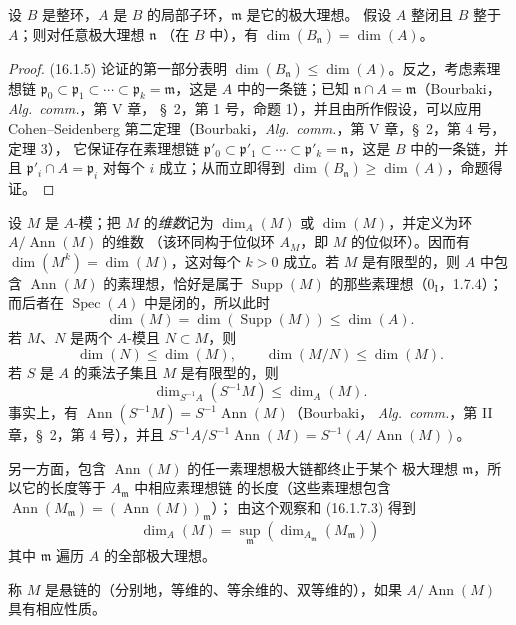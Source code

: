 \begin{proposition}[16.1.6]
\label{0.16.1.6-fr}
设 $B$ 是整环，$A$ 是 $B$ 的局部子环，$\mathfrak{m}$ 是它的极大理想。
假设 $A$ 整闭且 $B$ 整于 $A$；则对任意极大理想 $\mathfrak{n}$
（在 $B$ 中），有 $\dim(B_{\mathfrak{n}})=\dim(A)$。
\end{proposition}

\begin{proof}
(16.1.5) 论证的第一部分表明
$\dim(B_{\mathfrak{n}})\leq\dim(A)$。反之，考虑素理想链
$\mathfrak{p}_0\subset\mathfrak{p}_1\subset\cdots\subset
\mathfrak{p}_k=\mathfrak{m}$，这是 $A$ 中的一条链；已知
$\mathfrak{n}\cap A=\mathfrak{m}$（Bourbaki，\emph{Alg.~comm.}，第 V 章，
\S~2，第 1 号，命题 1），并且由所作假设，可以应用 Cohen--Seidenberg
第二定理（Bourbaki，\emph{Alg.~comm.}，第 V 章，\S~2，第 4 号，定理 3），
它保证存在素理想链
$\mathfrak{p}'_0\subset\mathfrak{p}'_1\subset\cdots\subset
\mathfrak{p}'_k=\mathfrak{n}$，这是 $B$ 中的一条链，并且
$\mathfrak{p}'_i\cap A=\mathfrak{p}_i$ 对每个 $i$ 成立；从而立即得到
$\dim(B_{\mathfrak{n}})\geq\dim(A)$，命题得证。
\end{proof}

\begin{env}[16.1.7]
\label{0.16.1.7-fr}
设 $M$ 是 $A$-模；把 $M$ 的\emph{维数}记为
$\dim_A(M)$ 或 $\dim(M)$，并定义为环 $A/\operatorname{Ann}(M)$ 的维数
（该环同构于位似环 $A_M$，即 $M$ 的位似环）。因而有
$\dim(M^k)=\dim(M)$，这对每个 $k>0$ 成立。若 $M$ 是有限型的，则 $A$ 中包含
$\operatorname{Ann}(M)$ 的素理想，恰好是属于 $\operatorname{Supp}(M)$
的那些素理想（$0_{\mathrm I}$，1.7.4）；而后者在
$\operatorname{Spec}(A)$ 中是闭的，所以此时
\[
\label{0.16.1.7.1-fr}
  \dim(M)=\dim(\operatorname{Supp}(M))\leq\dim(A).
\tag{16.1.7.1}
\]
若 $M$、$N$ 是两个 $A$-模且 $N\subset M$，则
\[
\label{0.16.1.7.2-fr}
  \dim(N)\leq\dim(M),\qquad \dim(M/N)\leq\dim(M).
\tag{16.1.7.2}
\]
若 $S$ 是 $A$ 的乘法子集且 $M$ 是有限型的，则
\[
\label{0.16.1.7.3-fr}
  \dim_{S^{-1}A}(S^{-1}M)\leq\dim_A(M).
\tag{16.1.7.3}
\]
事实上，有
$\operatorname{Ann}(S^{-1}M)=S^{-1}\operatorname{Ann}(M)$（Bourbaki，
\emph{Alg.~comm.}，第 II 章，\S~2，第 4 号），并且
$S^{-1}A/S^{-1}\operatorname{Ann}(M)=S^{-1}(A/\operatorname{Ann}(M))$。

另一方面，包含 $\operatorname{Ann}(M)$ 的任一素理想极大链都终止于某个
极大理想 $\mathfrak{m}$，所以它的长度等于 $A_{\mathfrak{m}}$ 中相应素理想链
的长度（这些素理想包含
$\operatorname{Ann}(M_{\mathfrak{m}})=(\operatorname{Ann}(M))_{\mathfrak{m}}$）；
由这个观察和 (16.1.7.3) 得到
\[
\label{0.16.1.7.4-fr}
  \dim_A(M)=\sup_{\mathfrak{m}}
  (\dim_{A_{\mathfrak{m}}}(M_{\mathfrak{m}}))
\tag{16.1.7.4}
\]
其中 $\mathfrak{m}$ 遍历 $A$ 的全部极大理想。

称 $M$ 是悬链的（分别地，等维的、等余维的、双等维的），如果
$A/\operatorname{Ann}(M)$ 具有相应性质。
\end{env}

